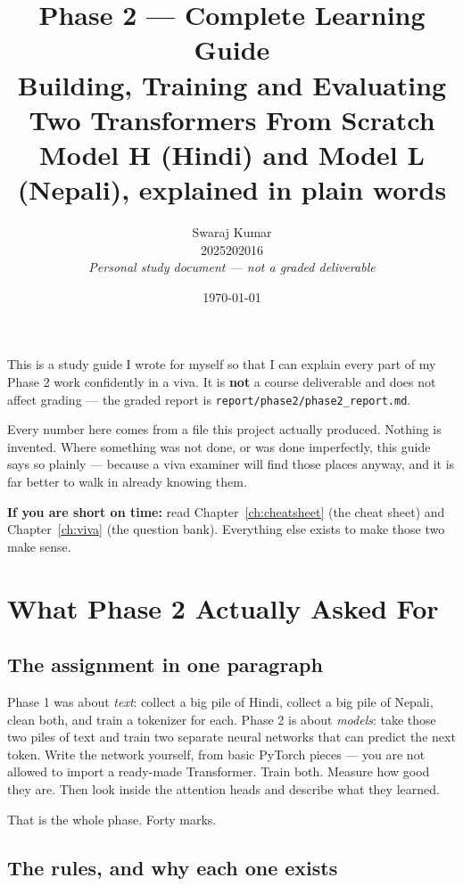 \documentclass[11pt]{report}
\title{\Huge\textbf{Phase 2 — Complete Learning Guide}\\[0.3cm]
\Large Building, Training and Evaluating Two Transformers From Scratch\\[0.2cm]
\large Model H (Hindi) and Model L (Nepali), explained in plain words}
\author{Swaraj Kumar \\ \small 2025202016 \\[0.2cm]
\small \textit{Personal study document --- not a graded deliverable}}
\date{\today}
\newcommand{\p}[1]{\texttt{#1}}
\begin{document}
\maketitle

\begin{tcolorbox}[colback=gray!8,colframe=gray!50!black,title={\textbf{What this document is, and how to use it}}]
This is a study guide I wrote for myself so that I can explain every part of my
Phase 2 work confidently in a viva. It is \textbf{not} a course deliverable and
does not affect grading --- the graded report is
\p{report/phase2/phase2\_report.md}.

Every number here comes from a file this project actually produced. Nothing is
invented. Where something was not done, or was done imperfectly, this guide says
so plainly --- because a viva examiner will find those places anyway, and it is
far better to walk in already knowing them.

\medskip
\textbf{If you are short on time:} read Chapter~\ref{ch:cheatsheet} (the cheat
sheet) and Chapter~\ref{ch:viva} (the question bank). Everything else exists to
make those two make sense.
\end{tcolorbox}

\tableofcontents

\chapter{What Phase 2 Actually Asked For}

\section{The assignment in one paragraph}

Phase 1 was about \emph{text}: collect a big pile of Hindi, collect a big pile of
Nepali, clean both, and train a tokenizer for each. Phase 2 is about
\emph{models}: take those two piles of text and train two separate neural
networks that can predict the next token. Write the network yourself, from basic
PyTorch pieces --- you are not allowed to import a ready-made Transformer.
Train both. Measure how good they are. Then look inside the attention heads and
describe what they learned.

That is the whole phase. Forty marks.

\section{The rules, and why each one exists}
\end{document}
